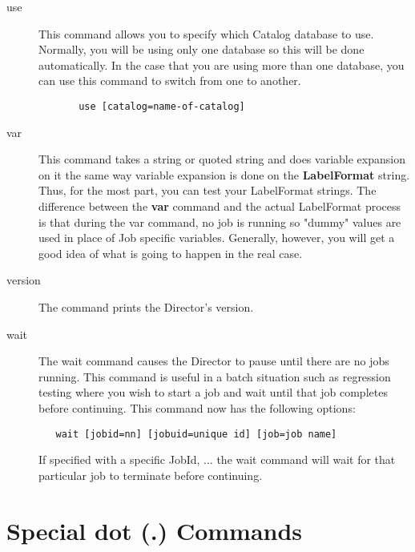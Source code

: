 \begin{description}
\item [use]
   This command allows you to specify which Catalog  database to use. Normally,
you will be using only one database so  this will be done automatically. In
the case that you are using  more than one database, you can use this command
to switch from  one to another.

\footnotesize
\begin{verbatim}
       use [catalog=name-of-catalog]
\end{verbatim}
\normalsize


\item [var]
   \label{var}
   This command takes a string or quoted string and  does variable expansion on
   it the same way variable expansion  is done on the {\bf LabelFormat} string.
   Thus, for the  most part, you can test your LabelFormat strings. The
   difference  between the {\bf var} command and the actual LabelFormat process
   is that during the var command, no job is running so "dummy"  values are
   used in place of Job specific variables. Generally,  however, you will get a
   good idea of what is going to happen  in the real case.

\item [version]
   The command prints the Director's version.

\item [wait]
   The wait command causes the Director to pause  until there are no jobs
   running. This command is useful in  a batch situation such as regression
   testing where you  wish to start a job and wait until that job completes
   before continuing. This command now has the following options:
\footnotesize
\begin{verbatim}
   wait [jobid=nn] [jobuid=unique id] [job=job name]
\end{verbatim}
\normalsize
   If specified with a specific JobId, ... the wait command will wait
   for that particular job to terminate before continuing.

\end{description}

\section{Special dot (.) Commands}
\label{dotcommands}


